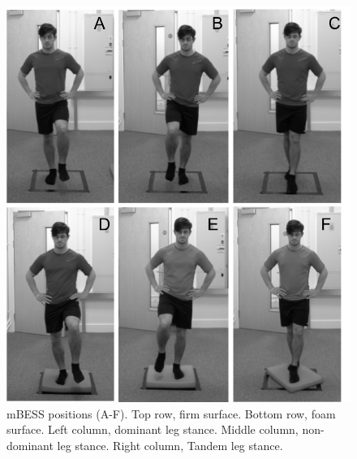 \documentclass[man,floatsintext]{apa6}
\begin{document}
\begin{figure}[!h]

{\centering \includegraphics[width=\textwidth]{figs/methods/BESS} 

}

\caption{mBESS positions (A-F). Top row, firm surface. Bottom row, foam surface. Left column, dominant leg stance. Middle column, non-dominant leg stance. Right column, Tandem leg stance.}\label{fig:bess-protocol}
\end{figure}
\end{document}
